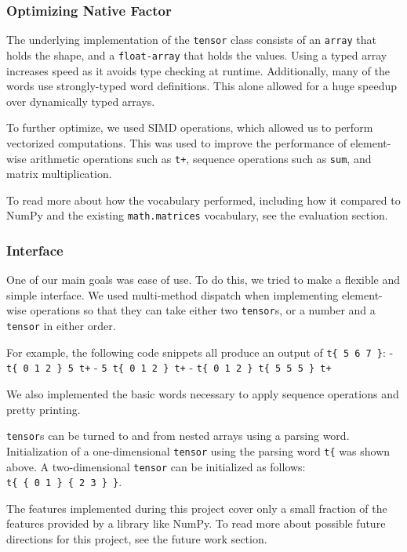 \documentclass[
]{article}
\begin{document}
\hypertarget{optimizing-native-factor}{%
\subsubsection{Optimizing Native
Factor}\label{optimizing-native-factor}}

The underlying implementation of the \texttt{tensor} class consists of
an \texttt{array} that holds the shape, and a \texttt{float-array} that
holds the values. Using a typed array increases speed as it avoids type
checking at runtime. Additionally, many of the words use strongly-typed
word definitions. This alone allowed for a huge speedup over dynamically
typed arrays.

To further optimize, we used SIMD operations, which allowed us to
perform vectorized computations. This was used to improve the
performance of element-wise arithmetic operations such as \texttt{t+},
sequence operations such as \texttt{sum}, and matrix multiplication.

To read more about how the vocabulary performed, including how it
compared to NumPy and the existing \texttt{math.matrices} vocabulary,
see the evaluation section.

\hypertarget{interface}{%
\subsubsection{Interface}\label{interface}}

One of our main goals was ease of use. To do this, we tried to make a
flexible and simple interface. We used multi-method dispatch when
implementing element-wise operations so that they can take either two
\texttt{tensor}s, or a number and a \texttt{tensor} in either order.

For example, the following code snippets all produce an output of
\texttt{t\{\ 5\ 6\ 7\ \}}: - \texttt{t\{\ 0\ 1\ 2\ \}\ 5\ t+} -
\texttt{5\ t\{\ 0\ 1\ 2\ \}\ t+} -
\texttt{t\{\ 0\ 1\ 2\ \}\ t\{\ 5\ 5\ 5\ \}\ t+}

We also implemented the basic words necessary to apply sequence
operations and pretty printing.

\texttt{tensor}s can be turned to and from nested arrays using a parsing
word. Initialization of a one-dimensional \texttt{tensor} using the
parsing word \texttt{t\{} was shown above. A two-dimensional
\texttt{tensor} can be initialized as follows:
\texttt{t\{\ \{\ 0\ 1\ \}\ \{\ 2\ 3\ \}\ \}}.

The features implemented during this project cover only a small fraction
of the features provided by a library like NumPy. To read more about
possible future directions for this project, see the future work
section.
\end{document}
